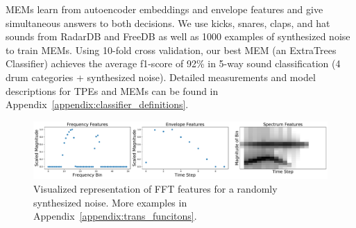 \documentclass[runningheads,a4paper]{llncs}
\begin{document}

MEMs learn from autoencoder embeddings and envelope features and give simultaneous answers to both decisions. We use kicks, snares, claps, and hat sounds from RadarDB and FreeDB as well as 1000 examples of synthesized noise to train MEMs. Using 10-fold cross validation, our best MEM (an ExtraTrees Classifier) achieves the average f1-score of 92\% in 5-way sound classification (4 drum categories + synthesized noise). Detailed measurements and model descriptions for TPEs and MEMs can be found in Appendix~\ref{appendix:classifier_definitions}. 

\begin{figure}[tbp]
\begin{center}
    \includegraphics[width=0.99\columnwidth]{templates_aimusic2020/images/ff3.pdf}
\caption{Visualized representation of FFT features for a randomly synthesized noise. More examples in Appendix~\ref{appendix:trans_funcitons}.}
\label{fig:stackspectrums}
    \end{center}
\end{figure}
\end{document}
